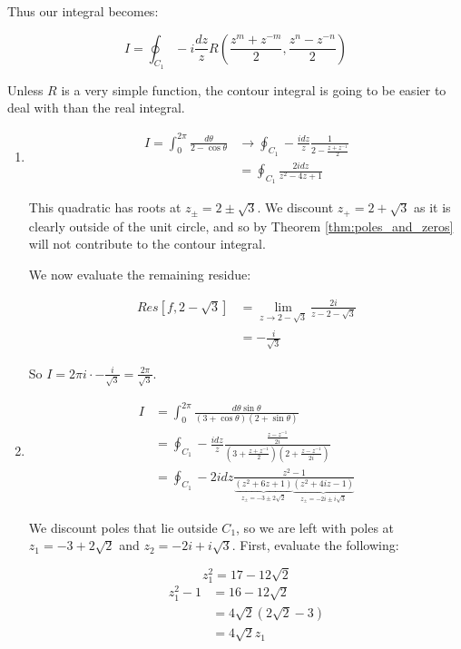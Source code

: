 \documentclass{physics_notes}
\begin{document}
Thus our integral becomes:

\[I = \oint_{C_1} -i \frac{dz}{z} R(\frac{z^m + z^{-m}}{2}, \frac{z^n - z^{-n}}{2})\]

Unless $R$ is a very simple function, the contour integral is going to be easier to deal with than the real integral. 

\begin{example}{}
\begin{enumerate}
\item{
	\begin{align*}
		I = \int_0^{2\pi} \frac{d\theta}{2-\cos{\theta}} &\rightarrow \oint_{C_1} -\frac{idz}{z} \frac{1}{2 - \frac{z + z^{-1}}{2}} \\
		&= \oint_{C_1} \frac{2idz}{z^2 - 4z + 1}
	\end{align*}

	This quadratic has roots at $z_\pm = 2\pm\sqrt{3}$. We discount $z_+ = 2+\sqrt{3}$ as it is clearly outside of the unit circle, and so by Theorem \ref{thm:poles_and_zeros} will not contribute to the contour integral. 

	We now evaluate the remaining residue:

	\begin{align*}
		Res[f, 2-\sqrt{3}] &= \lim_{z\to 2-\sqrt{3}} \frac{2i}{z-2-\sqrt{3}} \\
		&= -\frac{i}{\sqrt{3}}
	\end{align*}
	
	So $I = 2\pi i \cdot -\frac{i}{\sqrt{3}} = \frac{2\pi}{\sqrt{3}}$.	
}
\item{
	\begin{align*}
		I &= \int_0^{2\pi} \frac{d\theta \sin{\theta}}{(3+\cos{\theta})(2+\sin{\theta})} \\
		&= \oint_{C_1} -\frac{idz}{z} \frac{\frac{z - z^{-1}}{2i}}{(3 + \frac{z + z^{-1}}{2})(2 + \frac{z - z^{-1}}{2i})} \\
		&= \oint_{C_1} -2idz \frac{z^2 - 1}{\underbrace{(z^2 + 6z + 1)}_{z_\pm = -3\pm 2\sqrt{2}} \underbrace{(z^2 + 4iz - 1)}_{z_\pm = -2i \pm i\sqrt{3}}}
	\end{align*}

	We discount poles that lie outside $C_1$, so we are left with poles at $z_1 = -3 + 2\sqrt{2}$ and $z_2 = -2i + i\sqrt{3}$. First, evaluate the following:

	 \[
	 	z_1^2 = 17 - 12\sqrt{2}
 	\] 
 	\begin{align*}
 		z_1^2 - 1 &= 16 - 12\sqrt{2} \\
 		&= 4\sqrt{2}(2\sqrt{2} - 3) \\
 		&= 4\sqrt{2}z_1
 	\end{align*}

}
\end{enumerate}
\end{example}
\end{document}
